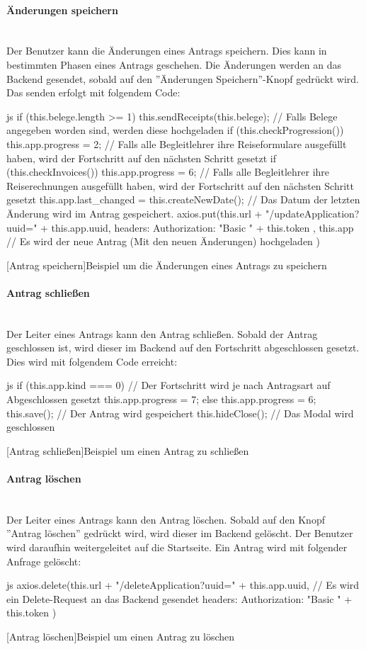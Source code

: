 \paragraph{Änderungen speichern}~\\
Der Benutzer kann die Änderungen eines Antrags speichern. Dies kann in bestimmten Phasen eines Antrags geschehen. Die Änderungen werden an das Backend gesendet, sobald auf den ''Änderungen Speichern''-Knopf gedrückt wird. Das senden erfolgt mit folgendem Code:
\begin{code}{js}
	if (this.belege.length >= 1) {
		this.sendReceipts(this.belege); // Falls Belege angegeben worden sind, werden diese hochgeladen
	}
	if (this.checkProgression()) {
		this.app.progress = 2;	// Falls alle Begleitlehrer ihre Reiseformulare ausgefüllt haben, wird der Fortschritt auf den nächsten Schritt gesetzt
	}
	if (this.checkInvoices()) {
		this.app.progress = 6; // Falls alle Begleitlehrer ihre Reiserechnungen ausgefüllt haben, wird der Fortschritt auf den nächsten Schritt gesetzt
	}
	this.app.last_changed = this.createNewDate(); // Das Datum der letzten Änderung wird im Antrag gespeichert.
	axios.put(this.url + "/updateApplication?uuid=" + this.app.uuid,
	{
		headers: {
			Authorization: "Basic " + this.token
		}
	},
	this.app // Es wird der neue Antrag (Mit den neuen Änderungen) hochgeladen
	)
\end{code}
[Antrag speichern]{Beispiel um die Änderungen eines Antrags zu speichern}~\\
\paragraph{Antrag schließen}~\\
Der Leiter eines Antrags kann den Antrag schließen. Sobald der Antrag geschlossen ist, wird dieser im Backend auf den Fortschritt abgeschlossen gesetzt. Dies wird mit folgendem Code erreicht:
\begin{code}{js}
	if (this.app.kind === 0) {	// Der Fortschritt wird je nach Antragsart auf Abgeschlossen gesetzt
		this.app.progress = 7;
	} else {
		this.app.progress = 6;
	}
	this.save(); // Der Antrag wird gespeichert
	this.hideClose(); // Das Modal wird geschlossen
\end{code}
[Antrag schließen]{Beispiel um einen Antrag zu schließen}~\\
\newpage
\paragraph{Antrag löschen}~\\
Der Leiter eines Antrags kann den Antrag löschen. Sobald auf den Knopf ''Antrag löschen'' gedrückt wird, wird dieser im Backend gelöscht. Der Benutzer wird daraufhin weitergeleitet auf die Startseite. Ein Antrag wird mit folgender Anfrage gelöscht:
\begin{code}{js}
	axios.delete(this.url + "/deleteApplication?uuid=" + this.app.uuid, { // Es wird ein Delete-Request an das Backend gesendet
		headers: {
			Authorization: "Basic " + this.token
		}
	})
\end{code}
[Antrag löschen]{Beispiel um einen Antrag zu löschen}~\\
\newpage
